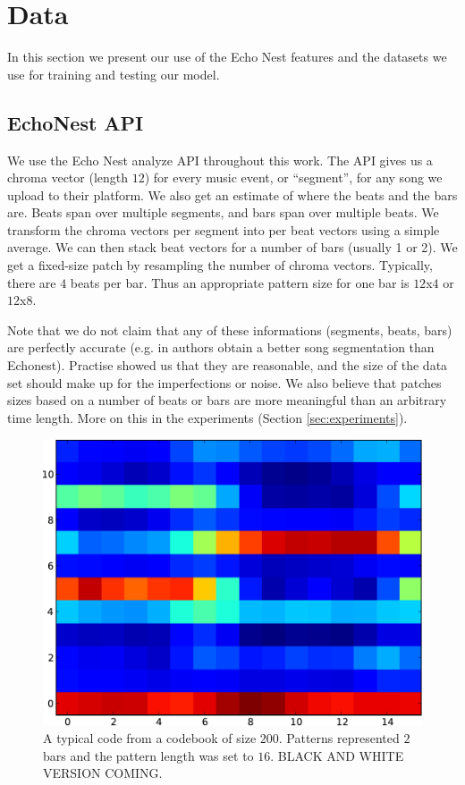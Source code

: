 \documentclass{article}
\begin{document}
\section{Data}\label{sec:data}
In this section we present our use of the Echo Nest features and the
datasets we use for training and testing our model.

\subsection{EchoNest API}
We use the Echo Nest analyze API \cite{EchoNest} throughout this work.
The API gives us a chroma vector (length $12$) for every music event, 
or ``segment'', for any song we upload to their platform. 
We also get an estimate of where the beats and the bars are. Beats span over
multiple segments, and bars span over multiple beats. 
We transform the chroma vectors per segment into per beat vectors using a 
simple average. We can then stack beat vectors for a number of bars 
(usually 1 or 2). 
We get a fixed-size patch by resampling the number of chroma vectors. Typically,
there are $4$ beats per bar. Thus an appropriate pattern size for one bar
is $12$x$4$ or $12$x$8$.

Note that we do not claim that any of these informations (segments, beats, bars)
are perfectly accurate (e.g. in \cite{Barrington2009a} authors obtain a better
song segmentation than Echonest). Practise showed us that they are reasonable, 
and the size of the data set should make up for the imperfections or noise.
We also believe that patches sizes based on a number of beats or bars are more
meaningful than an arbitrary time length. More on this in the experiments
(Section \ref{sec:experiments}).

\begin{figure}[htb]
\begin{center}
\includegraphics[width=.8\columnwidth]{code}
\end{center}
\caption{\small{A typical code from a codebook of size $200$. 
Patterns represented
$2$ bars and the pattern length was set to $16$.
BLACK AND WHITE VERSION COMING.
}}
\label{fig:code}
\end{figure}
\end{document}
